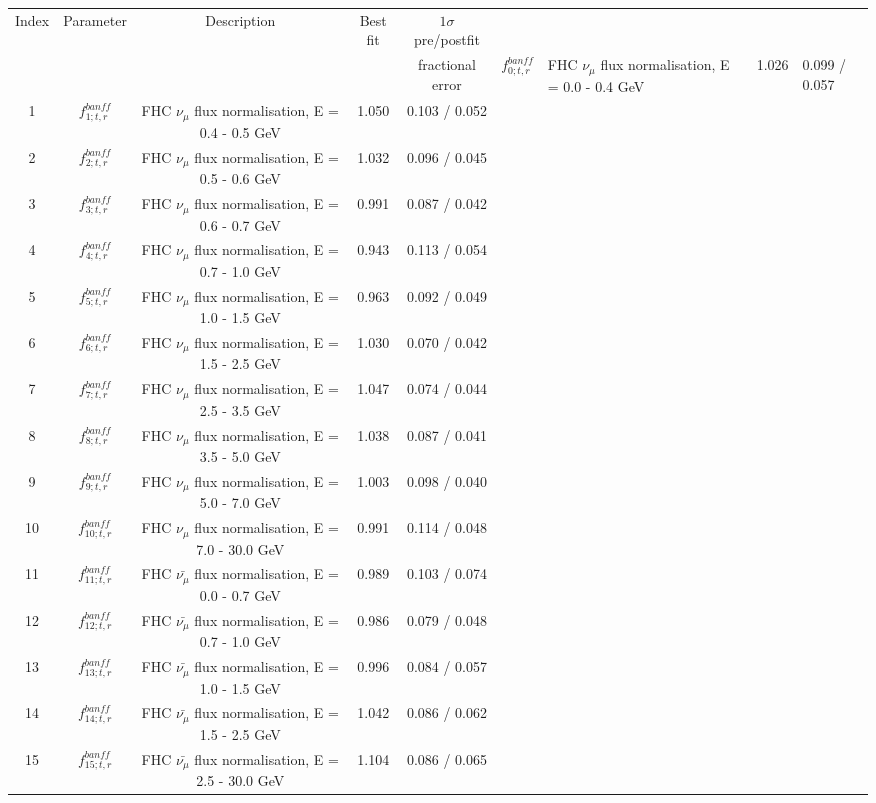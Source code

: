 \begin{tabular} { | c | c | c | c | c |  }
\hline 
Index & Parameter & Description & Best fit & $1\sigma$ pre/postfit\\ 
 & &  &  & fractional error
 & $f_{0; t, r}^{banff}$ & FHC $\nu_\mu$ flux normalisation, E = 0.0 - 0.4 GeV & 1.026 & 0.099 / 0.057\\ 
1 & $f_{1; t, r}^{banff}$ & FHC $\nu_\mu$ flux normalisation, E = 0.4 - 0.5 GeV & 1.050 & 0.103 / 0.052\\ 
2 & $f_{2; t, r}^{banff}$ & FHC $\nu_\mu$ flux normalisation, E = 0.5 - 0.6 GeV & 1.032 & 0.096 / 0.045\\ 
3 & $f_{3; t, r}^{banff}$ & FHC $\nu_\mu$ flux normalisation, E = 0.6 - 0.7 GeV & 0.991 & 0.087 / 0.042\\ 
4 & $f_{4; t, r}^{banff}$ & FHC $\nu_\mu$ flux normalisation, E = 0.7 - 1.0 GeV & 0.943 & 0.113 / 0.054\\ 
5 & $f_{5; t, r}^{banff}$ & FHC $\nu_\mu$ flux normalisation, E = 1.0 - 1.5 GeV & 0.963 & 0.092 / 0.049\\ 
6 & $f_{6; t, r}^{banff}$ & FHC $\nu_\mu$ flux normalisation, E = 1.5 - 2.5 GeV & 1.030 & 0.070 / 0.042\\ 
7 & $f_{7; t, r}^{banff}$ & FHC $\nu_\mu$ flux normalisation, E = 2.5 - 3.5 GeV & 1.047 & 0.074 / 0.044\\ 
8 & $f_{8; t, r}^{banff}$ & FHC $\nu_\mu$ flux normalisation, E = 3.5 - 5.0 GeV & 1.038 & 0.087 / 0.041\\ 
9 & $f_{9; t, r}^{banff}$ & FHC $\nu_\mu$ flux normalisation, E = 5.0 - 7.0 GeV & 1.003 & 0.098 / 0.040\\ 
10 & $f_{10; t, r}^{banff}$ & FHC $\nu_\mu$ flux normalisation, E = 7.0 - 30.0 GeV & 0.991 & 0.114 / 0.048\\ 
11 & $f_{11; t, r}^{banff}$ & FHC $\bar{\nu_\mu}$ flux normalisation, E = 0.0 - 0.7 GeV & 0.989 & 0.103 / 0.074\\ 
12 & $f_{12; t, r}^{banff}$ & FHC $\bar{\nu_\mu}$ flux normalisation, E = 0.7 - 1.0 GeV & 0.986 & 0.079 / 0.048\\ 
13 & $f_{13; t, r}^{banff}$ & FHC $\bar{\nu_\mu}$ flux normalisation, E = 1.0 - 1.5 GeV & 0.996 & 0.084 / 0.057\\ 
14 & $f_{14; t, r}^{banff}$ & FHC $\bar{\nu_\mu}$ flux normalisation, E = 1.5 - 2.5 GeV & 1.042 & 0.086 / 0.062\\ 
15 & $f_{15; t, r}^{banff}$ & FHC $\bar{\nu_\mu}$ flux normalisation, E = 2.5 - 30.0 GeV & 1.104 & 0.086 / 0.065\\ 

\end{tabular}
